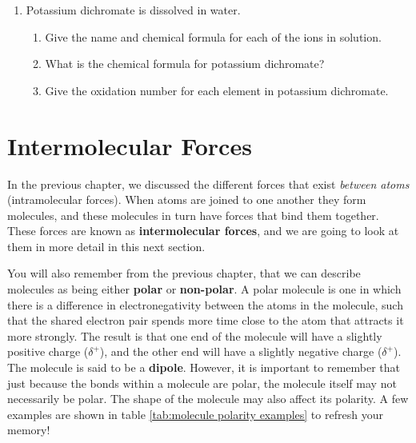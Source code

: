 \begin{eocexercises}{}
\begin{enumerate}
\item{Potassium dichromate is dissolved in water.}
	\begin{enumerate}
	\item{Give the name and chemical formula for each of the ions in solution.}
	\item{What is the chemical formula for potassium dichromate?}
	\item{Give the oxidation number for each element in potassium dichromate.}
	\end{enumerate}

\end{enumerate}

\practiceinfo
\end{eocexercises}









\chapter{Intermolecular Forces}
\label{chap:intermolecular}

In the previous chapter, we discussed the different forces that exist \textit{between atoms} (intramolecular forces). When atoms are joined to one another they form molecules, and these molecules in turn have forces that bind them together. These forces are known as \textbf{intermolecular forces}, and we are going to look at them in more detail in this next section.


You will also remember from the previous chapter, that we can describe molecules as being either \textbf{polar} or \textbf{non-polar}. A polar molecule is one in which there is a difference in electronegativity between the atoms in the molecule, such that the shared electron pair spends more time close to the atom that attracts it more strongly. The result is that one end of the molecule will have a slightly positive charge ($\delta^{+}$), and the other end will have a slightly negative charge ($\delta^{+}$). The molecule is said to be a \textbf{dipole}. However, it is important to remember that just because the bonds within a molecule are polar, the molecule itself may not necessarily be polar. The shape of the molecule may also affect its polarity. A few examples are shown in table \ref{tab:molecule polarity examples} to refresh your memory!

